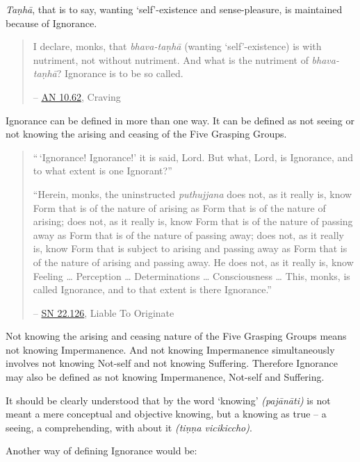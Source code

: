 \emph{Taṇhā}, that is to say, wanting `self'-existence and sense-pleasure, is maintained because of Ignorance.

\begin{quote}
I declare, monks, that \emph{bhava-taṇhā} (wanting `self'-existence) is with nutriment, not without nutriment. And what is the nutriment of \emph{bhava-taṇhā}? Ignorance is to be so called.

 -- \href{https://suttacentral.net/an10.62/en/bodhi}{AN 10.62}, Craving
\end{quote}

Ignorance can be defined in more than one way. It can be defined as not seeing or not knowing the arising and ceasing of the Five Grasping Groups.

\begin{quote}
``\,`Ignorance! Ignorance!' it is said, Lord. But what, Lord, is Ignorance, and to what extent is one Ignorant?''

``Herein, monks, the uninstructed \emph{puthujjana} does not, as it really is, know Form that is of the nature of arising as Form that is of the nature of arising; does not, as it really is, know Form that is of the nature of passing away as Form that is of the nature of passing away; does not, as it really is, know Form that is subject to arising and passing away as Form that is of the nature of arising and passing away. He does not, as it really is, know Feeling \ldots{} Perception \ldots{} Determinations \ldots{} Consciousness \ldots{} This, monks, is called Ignorance, and to that extent is there Ignorance.''

 -- \href{https://suttacentral.net/sn22.126/en/sujato}{SN 22.126}, Liable To Originate
\end{quote}

Not knowing the arising and ceasing nature of the Five Grasping Groups means not knowing Impermanence. And not knowing Impermanence simultaneously involves not knowing Not-self and not knowing Suffering. Therefore Ignorance may also be defined as not knowing Impermanence, Not-self and Suffering.

It should be clearly understood that by the word `knowing' \emph{(pajānāti)} is not meant a mere conceptual and objective knowing, but a knowing as true -- a seeing, a comprehending, with  about it \emph{(tiṇṇa vicikiccho)}.

\clearpage

Another way of defining Ignorance would be:

